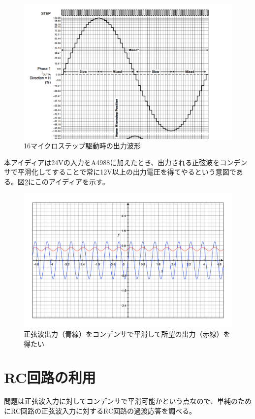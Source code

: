 \documentclass[]{jsarticle}
\begin{document}
\begin{figure}[htbp]
\centering
\includegraphics[width=130mm]{./image/16step.pdf}
\caption{16マイクロステップ駆動時の出力波形}
\label{microstep}
\end{figure}

本アイディアは24Vの入力をA4988に加えたとき、出力される正弦波をコンデンサで平滑化してすることで常に12V以上の出力電圧を得てやるという意図である。図\ref{namashi}にこのアイディアを示す。

\begin{figure}
\centering
\includegraphics[width=130mm]{./image/namashi.pdf}
\caption{正弦波出力（青線）をコンデンサで平滑して所望の出力（赤線）を得たい}
\label{namashi}
\end{figure}


\section{RC回路の利用}
問題は正弦波入力に対してコンデンサで平滑可能かという点なので、単純のためにRC回路の正弦波入力に対するRC回路の過渡応答を調べる。
\end{document}
